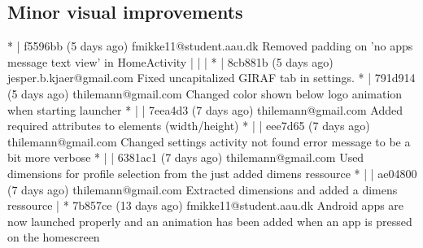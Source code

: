 \subsection{Minor visual improvements}
* | f5596bb (5 days ago) fmikke11@student.aau.dk Removed padding on 'no apps message text view' in HomeActivity
| | | * | 8cb881b (5 days ago) jesper.b.kjaer@gmail.com Fixed uncapitalized GIRAF tab in settings.
* | 791d914 (5 days ago) thilemann@gmail.com Changed color shown below logo animation when starting launcher
* | | 7eea4d3 (7 days ago) thilemann@gmail.com Added required attributes to elements (width/height)
* | | eee7d65 (7 days ago) thilemann@gmail.com Changed settings activity not found error message to be a bit more verbose
* | | 6381ac1 (7 days ago) thilemann@gmail.com Used dimensions for profile selection from the just added dimens ressource
* | | ae04800 (7 days ago) thilemann@gmail.com Extracted dimensions and added a dimens ressource
| * 7b857ce (13 days ago) fmikke11@student.aau.dk Android apps are now launched properly and an animation has been added when an app is pressed on the homescreen

